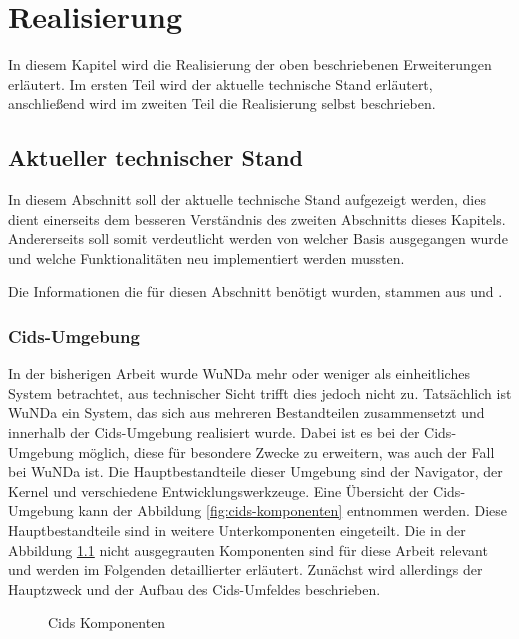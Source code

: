 \chapter{Realisierung} \label{ch:realisierung}

In diesem Kapitel wird die Realisierung der oben beschriebenen Erweiterungen erläutert.
Im ersten Teil wird der aktuelle technische Stand erläutert, anschließend wird im zweiten Teil die Realisierung selbst beschrieben. 

\section{Aktueller technischer Stand}

In diesem Abschnitt soll der aktuelle technische Stand aufgezeigt werden, dies dient einerseits dem besseren Verständnis des zweiten Abschnitts dieses Kapitels.
Andererseits soll somit verdeutlicht werden von welcher Basis ausgegangen wurde und welche Funktionalitäten neu implementiert werden mussten.

Die Informationen die für diesen Abschnitt benötigt wurden, stammen aus \autocite{cismet-cids} und \autocite{cismet-readme}.

\subsection{Cids-Umgebung}
In der bisherigen Arbeit wurde \ac{WuNDa} mehr oder weniger als einheitliches System betrachtet, aus technischer Sicht trifft dies jedoch nicht zu.
Tatsächlich ist \ac{WuNDa} ein System, das sich aus mehreren Bestandteilen zusammensetzt und innerhalb der Cids-Umgebung realisiert wurde.
Dabei ist es bei der Cids-Umgebung möglich, diese für besondere Zwecke zu erweitern, was auch der Fall bei \ac{WuNDa} ist.
Die Hauptbestandteile dieser Umgebung sind der Navigator, der Kernel und verschiedene Entwicklungswerkzeuge.
Eine Übersicht der Cids-Umgebung kann der Abbildung \vref{fig:cids-komponenten} entnommen werden.
Diese Hauptbestandteile sind in weitere Unterkomponenten eingeteilt. Die in der Abbildung \ref{fig:cids-komponenten} nicht ausgegrauten Komponenten sind für diese Arbeit relevant und werden im Folgenden detaillierter erläutert.
Zunächst wird allerdings der Hauptzweck und der Aufbau des Cids-Umfeldes beschrieben.

\begin{figure}[htb]
	\centering
	\caption{Cids Komponenten}
	\label{fig:cids-komponenten}
\end{figure}

